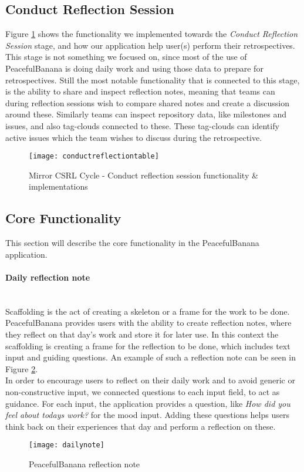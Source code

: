 \subsection{Conduct Reflection Session}
Figure \ref{conductreflectiontable} shows the functionality we implemented towards the \emph{Conduct Reflection Session} stage, and how our application help user(s) perform their retrospectives. 
This stage is not something we focused on, since most of the use of PeacefulBanana is doing daily work and using those data to prepare for retrospectives. Still the most notable functionality that is connected to this stage, is the ability to share and inspect reflection notes, meaning that teams can during reflection sessions wish to compare shared notes and create a discussion around these. Similarly teams can inspect repository data, like milestones and issues, and also tag-clouds connected to these. These tag-clouds can identify active issues which the team wishes to discuss during the retrospective. 
\begin{figure}[H]
\centering
    \texttt{[image: conductreflectiontable]}
\caption{Mirror CSRL Cycle - Conduct reflection session functionality \& implementations}
\label{conductreflectiontable}
\end{figure}

\subsection{Core Functionality}
This section will describe the core functionality in the PeacefulBanana application. 
\paragraph{Daily reflection note}\mbox{}\\
Scaffolding is the act of creating a skeleton or a frame for the work to be done.
PeacefulBanana provides users with the ability to create reflection notes, where they reflect on that day's work and store it for later use. In this context the scaffolding is creating a frame for the reflection to be done, which includes text input and guiding questions. An example of such a reflection note can be seen in Figure \ref{dailynotefunc}. \\
In order to encourage users to reflect on their daily work and to avoid generic or non-constructive input, we connected questions to each input field, to act as guidance. For each input, the application provides a question, like \emph{How did you feel about todays work?} for the mood input. Adding these questions helps users think back on their experiences that day and perform a reflection on these. 
\begin{figure}[H]
    \centering
        \texttt{[image: dailynote]}
    \caption{PeacefulBanana reflection note}
    \label{dailynotefunc}
\end{figure}

